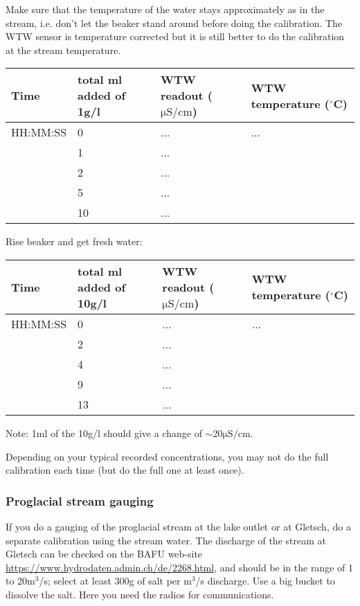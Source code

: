 \documentclass[DIV=15,halfparskip,11pt,headinclude]{scrartcl}
\begin{document}
Make sure that the temperature of the water stays approximately as in
the stream, i.e. don't let the beaker stand around before doing the
calibration.  The WTW sensor is temperature corrected but it is still
better to do the calibration at the stream temperature.

\begin{center}
\begin{tabular}{llll}
Time & total ml added of {\bf 1g/l}  & WTW readout ($\mathrm{\mu S/cm}$) & WTW temperature ($^\circ$C)\\
\hline
HH:MM:SS &0  & ... & ... \\ %
&1 & ...\\   %
&2 & ...\\   %
&5 & ... \\  %
&10 & ... \\ %
\end{tabular}
\end{center}

Rise beaker and get fresh water:

\begin{center}
\begin{tabular}{llll}
Time & total ml added of {\bf 10g/l}  & WTW readout ($\mathrm{\mu S/cm}$)& WTW temperature ($^\circ$C)\\
\hline
HH:MM:SS &0  & ... & ... \\ %
&2 & ...\\  %
&4 & ... \\ %
&9 & ... \\ %
&13 & ... \\ %
\end{tabular}
\end{center}

Note: 1ml of the 10g/l should give a change of $\sim$20$\mathrm{\mu S/cm}$.

Depending on your typical recorded concentrations, you may not do the
full calibration each time (but do the full one at least once).

\subsubsection{Proglacial stream gauging}

If you do a gauging of the proglacial stream at the lake outlet or at
Gletsch, do a separate calibration using the stream water.  The
discharge of the stream at Gletsch can be checked on the BAFU web-site
\url{https://www.hydrodaten.admin.ch/de/2268.html}, and should be in
the range of 1 to 20m$^3$/s; select at least 300g of salt per m$^3$/s
discharge.  Use a big bucket to dissolve the salt.  Here you need the
radios for communications.
\end{document}
